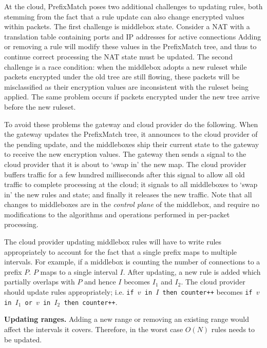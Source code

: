 


\label{sec:updates}
At the cloud, PrefixMatch poses two additional challenges to updating rules, both stemming from the fact that a rule update can also change encrypted values within packets.
The first challenge is middlebox state. Consider a NAT with a translation table containing ports and IP addresses for active connections
Adding or removing a rule will modify these values in the PrefixMatch tree, and thus to continue correct processing the NAT state must be updated.
The second challenge is a race condition: when the middlebox adopts a new ruleset while packets encrypted under the old tree are still flowing, these packets will be misclassified as their encryption values are inconsistent with the ruleset being applied. 
The same problem occurs if packets encrypted under the new tree arrive before the new ruleset.

To avoid these problems the gateway and cloud provider do the following. 
When the gateway updates the PrefixMatch tree, it announces to the cloud provider of the pending update, and the middleboxes ship their current state to the gateway to receive the new encryption values.
The gateway then sends a signal to the cloud provider that it is about to `swap in' the new map. 
The cloud provider buffers traffic for a few hundred milliseconds after this signal to allow all old traffic to complete processing at the cloud; it signals to all middleboxes to `swap in' the new rules and state; and finally it releases the new traffic.
Note that all changes to middleboxes are in the {\it control plane} of the middlebox, and require no modifications to the algorithms and operations performed in per-packet processing. 

The cloud provider updating middlebox rules will have to write rules appropriately to account for the fact that a 
single prefix maps to multiple intervals. For example, if a middlebox is counting the number of connections to a 
prefix $P$. $P$ maps to a single interval $I$. After updating, a new rule is added which partially overlaps 
with $P$ and hence $I$ becomes $I_1$ and $I_2$. The cloud provider should update rules appropriately; i.e. 
\texttt{if $v$ in $I$ then counter++} becomes \texttt{if $v$ in $I_1$ or $v$ in $I_2$ then counter++}.


\noindent \textbf{Updating ranges.}
Adding a new range or removing an existing range would affect the intervals it covers. Therefore, in the worst case $O(N)$ rules needs to be updated. 


